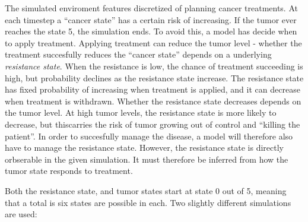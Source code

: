 \documentclass[notspecified,article,submit,moreauthors,pdftex]{Definitions/mdpi}
\begin{document}
The simulated enviroment features discretized of planning cancer
treatments. At each timestep a ``cancer state'' has a certain risk of
increasing. If the tumor ever reaches the state 5, the simulation ends.
To avoid this, a model has decide when to apply treatment. Applying
treatment can reduce the tumor level - whether the treatment succesfully
reduces the ``cancer state'' depends on a underlying \emph{resistance
state}. When the resistance is low, the chance of treatment succeeding
is high, but probability declines as the resistance state increase. The
resistance state has fixed probability of increasing when treatment is
applied, and it can decrease when treatment is withdrawn. Whether the
resistance state decreases depends on the tumor level. At high tumor
levels, the resistance state is more likely to decrease, but thiscarries
the risk of tumor growing out of control and ``killing the patient''. In
order to succesfully manage the disease, a model will therefore also
have to manage the resistance state. However, the resistance state is
directly orbserable in the given simulation. It must therefore be
inferred from how the tumor state responds to treatment.

Both the resistance state, and tumor states start at state 0 out of 5,
meaning that a total is six states are possible in each. Two slightly
different simulations are used:
\end{document}
